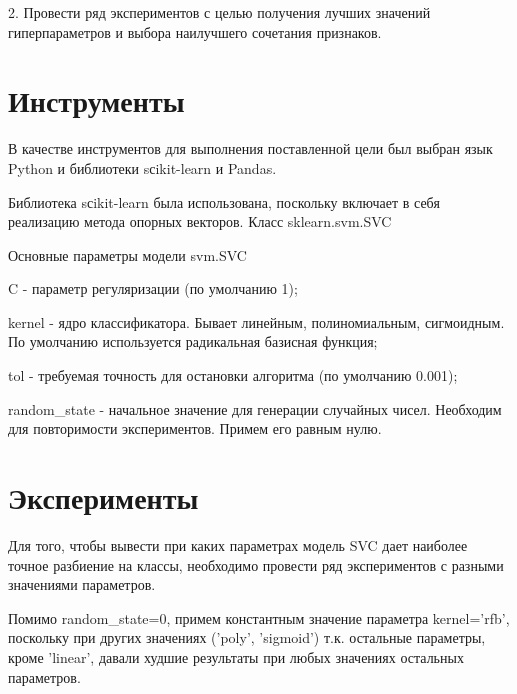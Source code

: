 \documentclass[a4paper,12pt]{article}
\begin{document}
	\vspace{0.1cm}
	2. Провести ряд экспериментов с целью получения лучших значений гиперпараметров и выбора наилучшего сочетания признаков.
	
\newpage\section{Инструменты} 
	В качестве инструментов для выполнения поставленной цели был выбран язык Python и библиотеки sсikit-learn и Pandas.
	
	\vspace{0.5cm}
	Библиотека sсikit-learn была использована, поскольку включает в себя реализацию метода опорных векторов. Класс sklearn.svm.SVC
	
	\vspace{0.5cm}
	Основные параметры модели svm.SVC
	
	\vspace{0.5cm}
	C - параметр регуляризации (по умолчанию 1);
	
	\vspace{0.5cm}
	kernel - ядро классификатора. Бывает линейным, полиномиальным, сигмоидным. По умолчанию используется радикальная базисная функция;
	
	\vspace{0.5cm}
	tol - требуемая точность для остановки алгоритма (по умолчанию 0.001);
	
	\vspace{0.5cm}
	random\_state - начальное значение для генерации случайных чисел. Необходим для повторимости экспериментов. Примем его равным нулю.


	
\newpage\section{Эксперименты}
	Для того, чтобы вывести при каких параметрах модель SVC дает наиболее точное разбиение на классы, необходимо провести ряд экспериментов с разными значениями параметров. 
	
	\vspace{0.5cm}
	Помимо random\_state=0, примем константным значение параметра kernel='rfb', поскольку при других значениях ('poly', 'sigmoid') т.к. остальные параметры, кроме 'linear', давали худшие результаты при любых значениях остальных параметров.
	
\end{document}
